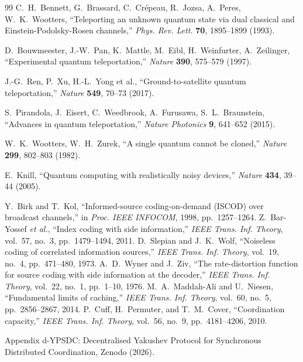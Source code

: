 \documentclass[12pt,a4paper]{article}
\theoremstyle{remark}
\begin{document}
\begin{thebibliography}{99}
		 C.~H.~Bennett, G.~Brassard, C.~Crépeau, R.~Jozsa, A.~Peres, W.~K.~Wootters,
		``Teleporting an unknown quantum state via dual classical and Einstein-Podolsky-Rosen channels,''
		\emph{Phys. Rev. Lett.} \textbf{70}, 1895--1899 (1993).
		
		 D.~Bouwmeester, J.-W.~Pan, K.~Mattle, M.~Eibl, H.~Weinfurter, A.~Zeilinger,
		``Experimental quantum teleportation,''
		\emph{Nature} \textbf{390}, 575--579 (1997).
		
		 J.-G.~Ren, P.~Xu, H.-L.~Yong et al.,
		``Ground-to-satellite quantum teleportation,''
		\emph{Nature} \textbf{549}, 70--73 (2017).
		
		 S.~Pirandola, J.~Eisert, C.~Weedbrook, A.~Furusawa, S.~L.~Braunstein,
		``Advances in quantum teleportation,''
		\emph{Nature Photonics} \textbf{9}, 641--652 (2015).
		
		 W.~K.~Wootters, W.~H.~Zurek,
		``A single quantum cannot be cloned,''
		\emph{Nature} \textbf{299}, 802--803 (1982).
		
		 E.~Knill,
		``Quantum computing with realistically noisy devices,''
		\emph{Nature} \textbf{434}, 39--44 (2005).
		
		 Y.~Birk and T.~Kol, ``Informed-source coding-on-demand (ISCOD) over broadcast channels,'' in \emph{Proc. IEEE INFOCOM}, 1998, pp.~1257--1264.
		 Z.~Bar-Yossef \emph{et al.}, ``Index coding with side information,'' \emph{IEEE Trans. Inf. Theory}, vol.~57, no.~3, pp.~1479--1494, 2011.
		 D.~Slepian and J.~K.~Wolf, ``Noiseless coding of correlated information sources,'' \emph{IEEE Trans. Inf. Theory}, vol.~19, no.~4, pp.~471--480, 1973.
		 A.~D.~Wyner and J.~Ziv, ``The rate-distortion function for source coding with side information at the decoder,'' \emph{IEEE Trans. Inf. Theory}, vol.~22, no.~1, pp.~1--10, 1976.
		 M.~A.~Maddah-Ali and U.~Niesen, ``Fundamental limits of caching,'' \emph{IEEE Trans. Inf. Theory}, vol.~60, no.~5, pp.~2856--2867, 2014.
		 P.~Cuff, H.~Permuter, and T.~M.~Cover, ``Coordination capacity,'' \emph{IEEE Trans. Inf. Theory}, vol.~56, no.~9, pp.~4181--4206, 2010.
		
		Appendix d-YPSDC: Decentralised Yakushev Protocol for Synchronous Distributed Coordination, Zenodo (2026).
		
	\end{thebibliography}
	
\end{document}
